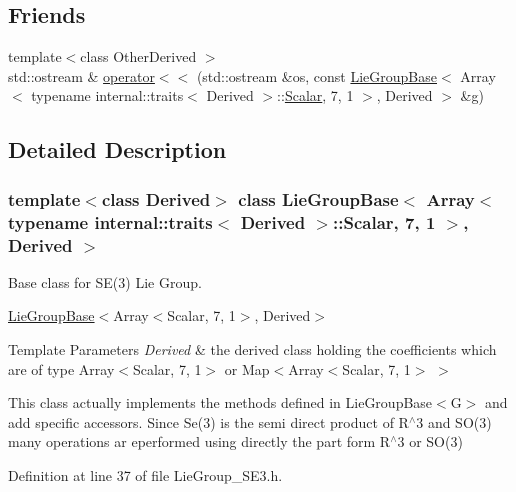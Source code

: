 \subsection*{Friends}
\begin{DoxyCompactItemize}
\item 
{\footnotesize template$<$class Other\+Derived $>$ }\\std\+::ostream \& \hyperlink{class_lie_group_base_3_01_array_3_01typename_01internal_1_1traits_3_01_derived_01_4_1_1_scalar_0d6d4b5459662fc32c7117aee50362fb1_ac04a80c43e9803f7e73b6dc0fd85d184}{operator$<$$<$} (std\+::ostream \&os, const \hyperlink{class_lie_group_base}{Lie\+Group\+Base}$<$ Array$<$ typename internal\+::traits$<$ Derived $>$\+::\hyperlink{class_lie_group_base_3_01_array_3_01typename_01internal_1_1traits_3_01_derived_01_4_1_1_scalar_0d6d4b5459662fc32c7117aee50362fb1_a831695c575380c9a1df32eff9fc4a8c6}{Scalar}, 7, 1 $>$, Derived $>$ \&g)
\end{DoxyCompactItemize}


\subsection{Detailed Description}
\subsubsection*{template$<$class Derived$>$\newline
class Lie\+Group\+Base$<$ Array$<$ typename internal\+::traits$<$ Derived $>$\+::\+Scalar, 7, 1 $>$, Derived $>$}

Base class for S\+E(3) Lie Group. 

\hyperlink{class_lie_group_base}{Lie\+Group\+Base}$<$Array$<$\+Scalar, 7, 1$>$, Derived$>$


\begin{DoxyTemplParams}{Template Parameters}
{\em Derived} & the derived class holding the coefficients which are of type Array$<$\+Scalar, 7, 1$>$ or Map$<$Array$<$\+Scalar, 7, 1$>$ $>$\\
\hline
\end{DoxyTemplParams}
This class actually implements the methods defined in Lie\+Group\+Base$<$\+G$>$ and add specific accessors. Since Se(3) is the semi direct product of R$^\wedge$3 and S\+O(3) many operations ar eperformed using directly the part form R$^\wedge$3 or S\+O(3) 

Definition at line 37 of file Lie\+Group\+\_\+\+S\+E3.\+h.



